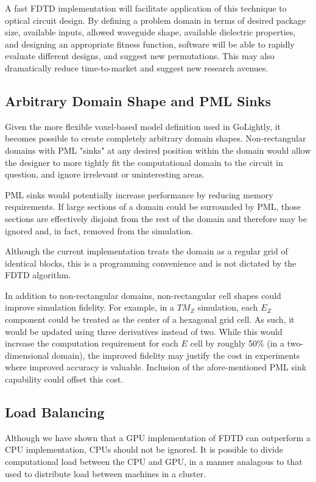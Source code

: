 A fast FDTD implementation will facilitate application of this technique to optical circuit design. By defining a problem domain in terms of desired package size, available inputs, allowed waveguide shape, available dielectric properties, and designing an appropriate fitness function, software will be able to rapidly evaluate different designs, and suggest new permutations. This may also dramatically reduce time-to-market and suggest new research avenues. 


\subsection{Arbitrary Domain Shape and PML Sinks}
Given the more flexible voxel-based model definition used in GoLightly, it becomes possible to create completely arbitrary domain shapes. Non-rectangular domains with PML "sinks" at any desired position within the domain would allow the designer to more tightly fit the computational domain to the circuit in question, and ignore irrelevant or uninteresting areas.

PML sinks would potentially increase performance by reducing memory requirements. If large sections of a domain could be surrounded by PML, those sections are effectively disjoint from the rest of the domain and therefore may be ignored and, in fact, removed from the simulation. 

Although the current implementation treats the domain as a regular grid of identical blocks, this is a programming convenience and is not dictated by the FDTD algorithm.

In addition to non-rectangular domains, non-rectangular cell shapes could improve simulation fidelity. For example, in a $TM_Z$ simulation, each $E_Z$ component could be treated as the center of a hexagonal grid cell. As such, it would be updated using three derivatives instead of two. While this would increase the computation requirement for each $E$ cell by roughly 50\% (in a two-dimensional domain), the improved fidelity may justify the cost in experiments where improved accuracy is valuable. Inclusion of the afore-mentioned PML sink capability could offset this cost. 

\subsection{Load Balancing}
Although we have shown that a GPU implementation of FDTD can outperform a CPU implementation, CPUs should not be ignored. It is possible to divide computational load between the CPU and GPU, in a manner analagous to that used to distribute load between machines in a cluster. 

